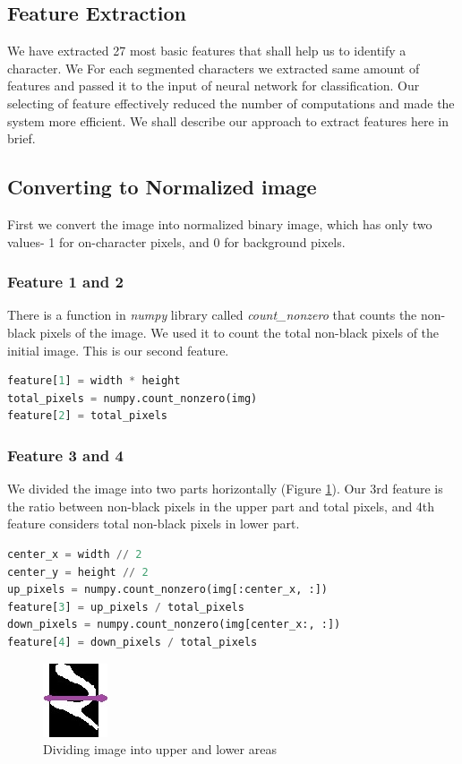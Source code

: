 \documentclass{standalone}
\begin{document}
\subsection{Feature Extraction}
We have extracted 27 most basic features that shall help us to identify a character. We For each segmented characters we extracted same amount of features and passed it to the input of neural network for classification. Our selecting of feature effectively reduced the number of computations and made the system more efficient. We shall describe our approach to extract features here in brief.

\subsection{Converting to Normalized image}
First we convert the image into normalized binary image, which has only two values- 1 for on-character pixels, and 0 for background pixels.

\subsubsection{Feature 1 and 2}
There is a function in {\it numpy} library called {\it count\_nonzero} that counts the non-black pixels of the image. We used it to count the total non-black pixels of the initial image. This is our second feature.
\begin{lstlisting}[language=Python]
feature[1] = width * height
total_pixels = numpy.count_nonzero(img)
feature[2] = total_pixels
\end{lstlisting}

\subsubsection{Feature 3 and 4}
We divided the image into two parts horizontally (Figure \ref{fig:FeatureHor}). Our 3rd feature is the ratio between non-black pixels in the upper part and total pixels, and 4th feature considers total non-black pixels in lower part.
\begin{lstlisting}[language=Python]
center_x = width // 2
center_y = height // 2
up_pixels = numpy.count_nonzero(img[:center_x, :])
feature[3] = up_pixels / total_pixels
down_pixels = numpy.count_nonzero(img[center_x:, :])
feature[4] = down_pixels / total_pixels
\end{lstlisting}

\begin{figure}
\centering
\includegraphics{img/feature/hor}
\caption{Dividing image into upper and lower areas}
\label{fig:FeatureHor}
\end{figure}
\end{document}
